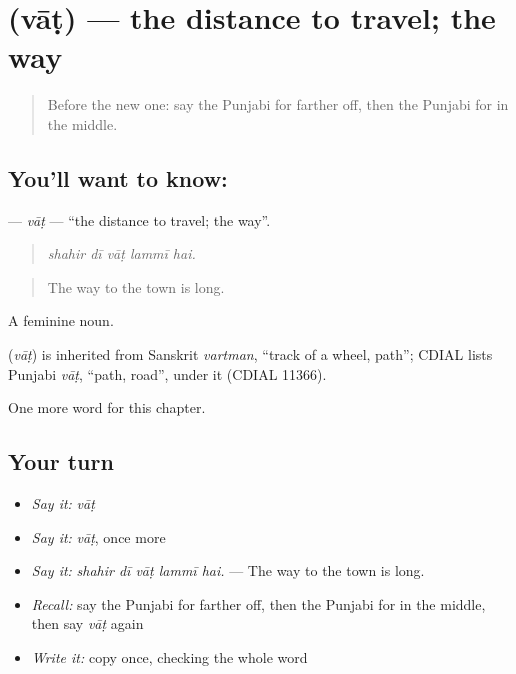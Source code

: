 \section[\texorpdfstring{\pa{ਵਾਟ} (vāṭ)}{ਵਾਟ (vāṭ)}]{ (vāṭ) — the distance to travel; the way}

\label{lesson:PA-C265-vat}



\begin{quote}
Before the new one: say the Punjabi for farther off, then the Punjabi for in the middle.
\end{quote}

\subsection*{You'll want to know: }
\textbf{} — \emph{vāṭ} — \textquotedblleft{}the distance to travel; the way\textquotedblright{}.

\begin{quote}
    
\end{quote}

\begin{quote}
\emph{shahir dī vāṭ lammī hai.}
\end{quote}

\begin{quote}
The way to the town is long.
\end{quote}

A feminine noun.

\begin{cousinweb}
\textbf{} (\emph{vāṭ}) is inherited from Sanskrit \emph{vartman}, \textquotedblleft{}track of a wheel, path\textquotedblright{}; CDIAL lists Punjabi \emph{vāṭ}, \textquotedblleft{}path, road\textquotedblright{}, under it (CDIAL 11366).
\end{cousinweb}

\begin{grammarlens}[title={What you've built}]
One more word for this chapter.
\end{grammarlens}

\subsection*{Your turn}
\begin{itemize}
\raggedright
  \item \emph{Say it:} \emph{vāṭ}
  \item \emph{Say it:} \emph{vāṭ}, once more
  \item \emph{Say it:} \emph{shahir dī vāṭ lammī hai.} — The way to the town is long.
  \item \emph{Recall:} say the Punjabi for farther off, then the Punjabi for in the middle, then say \emph{vāṭ} again
  \item \emph{Write it:} copy \textbf{} once, checking the whole word
\end{itemize}

